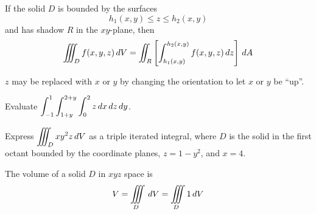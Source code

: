 \documentclass[letterpaper, twoside, 12pt]{book}
\begin{document}
          \begin{contributors}

          \end{contributors}

\begin{theorem}
  If the solid $D$ is bounded by the surfaces
    \[
      h_1(x,y)\leq z\leq h_2(x,y)
    \]
  and has shadow $R$ in the $xy$-plane, then
    \[
      \iiint_D f(x,y,z)\,d{V}
        =
      \iint_R\left[ \int_{h_1(x,y)}^{h_2(x,y)} f(x,y,z) \,d{z} \right]\,d{A}
    \]
\end{theorem}

\begin{remark}
  $z$ may be replaced with $x$ or $y$ by changing the orientation to
  let $x$ or $y$ be ``up''.
\end{remark}

          \begin{problem}
            Evaluate
            $\displaystyle\int_{-1}^1\int_{1+y}^{2+y}\int_0^2 z \,d{x}\,d{z}\,d{y}$.
          \end{problem}

          \begin{solution}

          \end{solution}

          \begin{contributors}

          \end{contributors}

          \begin{problem}
            Express $\displaystyle\iiint_D xy^2z \,d{V}$ as a triple iterated integral,
            where $D$ is the solid in the first octant bounded by the
            coordinate planes, $z=1-y^2$, and $x=4$.
          \end{problem}

          \begin{solution}

          \end{solution}

          \begin{contributors}

          \end{contributors}

\begin{theorem}
  The volume of a solid $D$ in $xyz$ space is
  \[V = \iiint\limits_D\,d{V}=\iiint\limits_D 1 \,d{V}\]
\end{theorem}
\end{document}
